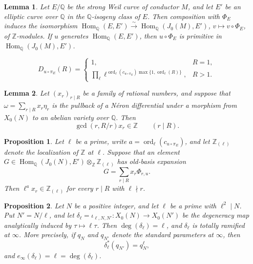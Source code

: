\documentclass[10pt,a4paper]{amsart}
\newtheorem{lemma}{Lemma}
\newtheorem{proposition}{Proposition}
\newcommand{\Hom}{\operatorname{Hom}}
\newcommand{\Q}{\mathbb Q}
\newcommand{\Z}{\mathbb Z}
\DeclareMathOperator{\ord}{ord}
\begin{document}
\begin{lemma}\label{lem:optimal-primitivity}
Let \(E/\Q\) be the strong Weil curve of conductor \(M\), and let \(E'\) be an
elliptic curve over \(\Q\) in the \(\Q\)-isogeny class of \(E\). Then composition
with \(\Phi_E\) induces the isomorphism
\(\Hom_\Q(E,E')\xrightarrow{\sim}\Hom_\Q(J_0(M),E')\),
\(v\mapsto v\circ\Phi_E\), of \(\Z\)-modules.
If \(u\) generates \(\Hom_\Q(E,E')\), then \(u\circ\Phi_E\) is primitive in
\(\Hom_\Q(J_0(M),E')\).
\end{lemma}

\begin{equation}\label{eq:D-factor}
        D_{u\circ\pi_E}(R)=
        \begin{cases}
        1, & R=1,\\[3pt]
        \displaystyle
        \prod_{\ell}\ell^{\ord_\ell(c_{u\circ\pi_E})\max\{1,\ord_\ell(R)\}},
        & R>1.
        \end{cases}
\end{equation}

\begin{lemma}\label{lem:two-cusp}
Let \((x_r)_{r\mid R}\) be a family of rational numbers, and suppose that
\(\omega=\sum_{r\mid R}x_r\eta_r\) is the pullback of a N\'eron differential
under a morphism from \(X_0(N)\) to an abelian variety over \(\Q\).
Then
\begin{equation}\label{eq:gcd-condition}
        \gcd(r,R/r)x_r\in\Z
        \qquad(r\mid R).
\end{equation}
\end{lemma}

\begin{proposition}\label{prop:remove}
Let \(\ell\) be a prime, write \(a=\ord_\ell(c_{u\circ\pi_E})\), and let \(\Z_{(\ell)}\) denote
the localization of \(\Z\) at \(\ell\). Suppose that an element
\(G\in\Hom_\Q(J_0(N),E')\otimes_\Z\Z_{(\ell)}\) has old-basis expansion
\[
        G=\sum_{r\mid R}x_r\Phi_{r,u}.
\]
Then \(\ell^a x_r\in\Z_{(\ell)}\) for every \(r\mid R\) with \(\ell\nmid r\).
\end{proposition}

\begin{proposition}\label{prop:degeneracy-degree-ramification}
Let \(N\) be a positive integer, and let \(\ell\) be a prime with
\(\ell^2\mid N\). Put \(N'=N/\ell\), and let
\(\delta_\ell=\iota_{\ell,N,N'}:X_0(N)\to X_0(N')\) be the degeneracy map
analytically induced by \(\tau\mapsto \ell\tau\).
Then \(\deg(\delta_\ell)=\ell\), and \(\delta_\ell\) is totally ramified at
\(\infty\). More
precisely, if \(q_N\) and \(q_{N'}\) denote the standard parameters at
\(\infty\), then
\begin{equation}\label{eq:q-total-ramification}
        \delta_\ell^*(q_{N'})=q_N^\ell,
\end{equation}
and \(e_\infty(\delta_\ell)=\ell=\deg(\delta_\ell)\).
\end{proposition}
\end{document}

